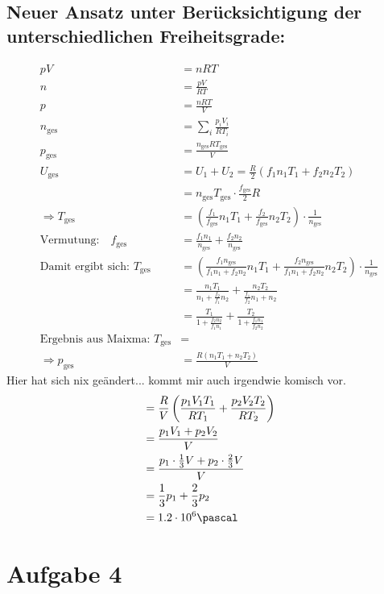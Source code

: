\documentclass[12pt,a4paper,notitlepage]{article}
\newcommand{\aufgabe}[1]{\section*{\setcounter{section}{#1}Aufgabe #1}}
\begin{document}
\subsection*{Neuer Ansatz unter Berücksichtigung der unterschiedlichen Freiheitsgrade:}
\begin{align}
pV&=nRT\\
n&=\frac{pV}{RT}\\
p&=\frac{nRT}{V}\\
n_\text{ges}&=\sum_i\frac{p_iV_i}{RT_i}\\
p_\text{ges}&=\frac{n_\text{ges}RT_\text{ges}}{V}\\
U_\text{ges}&=U_1+U_2=\frac{R}{2}\left(f_1n_1T_1+f_2n_2T_2\right)\\
&=n_\text{ges}T_\text{ges}\cdot\frac{f_\text{ges}}{2}R\\
\Rightarrow T_\text{ges}&=\left(\frac{f_1}{f_\text{ges}}n_1T_1+\frac{f_2}{f_\text{ges}}n_2T_2\right)\cdot\frac{1}{n_\text{ges}}\\
\text{Vermutung:}\quad f_\text{ges}&=\frac{f_1n_1}{n_\text{ges}}+\frac{f_2n_2}{n_\text{ges}}\\
\text{Damit ergibt sich: }T_\text{ges}&=\left(\frac{f_1n_\text{ges}}{f_1n_1+f_2n_2}n_1T_1+\frac{f_2n_\text{ges}}{f_1n_1+f_2n_2}n_2T_2\right)\cdot\frac{1}{n_\text{ges}}\\
&=\frac{n_1T_1}{n_1+\frac{f_2}{f_1}n_2}+\frac{n_2T_2}{\frac{f_1}{f_2}n_1+n_2}\\
&=\frac{T_1}{1+\frac{f_2n_2}{f_1n_1}}+\frac{T_2}{1+\frac{f_1n_1}{f_2n_2}}\\
\text{Ergebnis aus Maixma: }T_\text{ges}&=\\
\Rightarrow p_\text{ges}&=\frac{R\left(n_1T_1+n_2T_2\right)}{V}
\end{align}
Hier hat sich nix geändert... kommt mir auch irgendwie komisch vor.
\begin{align}
&=\frac{R}{V}\left(\frac{p_1V_1T_1}{RT_1}+\frac{p_2V_2T_2}{RT_2}\right)\\
&=\frac{p_1V_1+p_2V_2}{V}\\
&=\frac{p_1\cdot\frac{1}{3}V+p_2\cdot\frac{2}{3}V}{V}\\
&=\frac{1}{3}p_1+\frac{2}{3}p_2\\
&=1.2\cdot 10^6\pascal
\end{align}
\aufgabe{4}
\end{document}
